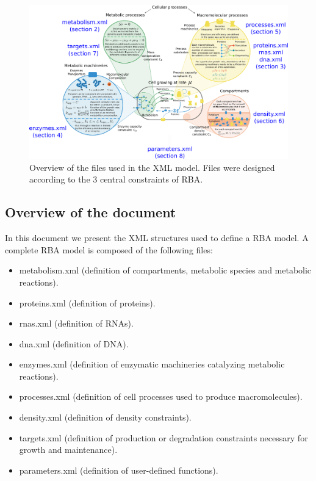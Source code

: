 \documentclass[12pt]{scrartcl}
\begin{document}
\begin{figure}
  \includegraphics[width=\linewidth]{overview}
  \caption{Overview of the files used in the XML model.
  Files were designed according to the 3 central constraints of RBA.}
  \label{fig:overview}
\end{figure}

\subsection{Overview of the document}

In this document we present the XML structures used to define a RBA model.
A complete RBA model is composed of the following files:
\begin{itemize}
  \item metabolism.xml
  (definition of compartments, metabolic species and metabolic reactions).
  \item proteins.xml (definition of proteins).
  \item rnas.xml (definition of RNAs).
  \item dna.xml (definition of DNA).
  \item enzymes.xml
  (definition of enzymatic machineries catalyzing metabolic reactions).
  \item processes.xml
  (definition of cell processes used to produce macromolecules).
  \item density.xml (definition of density constraints).
  \item targets.xml
  (definition of production or degradation constraints necessary for growth and maintenance).
  \item parameters.xml
  (definition of user-defined functions).
\end{itemize}
\end{document}
